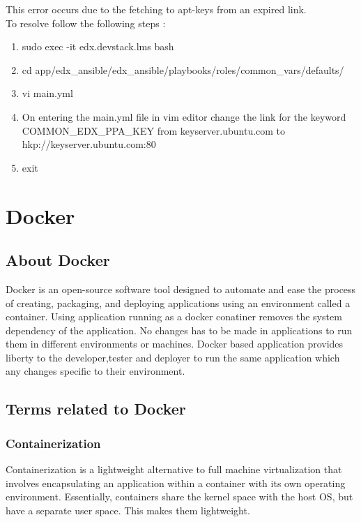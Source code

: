 \documentclass[12pt]{report}
\begin{document}
\begin{enumerate}
	This error occurs due to the fetching to apt-keys from an expired link.\\
	To resolve follow the following steps :
	\begin{enumerate}
		\item sudo exec -it edx.devstack.lms bash
		\item cd app/edx\_ansible/edx\_ansible/playbooks/roles/common\_vars/defaults/
		\item vi main.yml
		\item On entering the main.yml file in vim editor change the link for the keyword 
		COMMON\_EDX\_PPA\_KEY from keyserver.ubuntu.com to  hkp://keyserver.ubuntu.com:80
		\item exit
	\end{enumerate}
\end{enumerate}

\chapter{Docker}
\section{About Docker}
Docker is an open-source software tool designed to automate and ease the process of creating, packaging, and deploying applications using an environment called a container. Using application running as a docker conatiner removes the system dependency of the application. No changes has to be made in applications to run them in different environments or machines. Docker based application provides liberty to the developer,tester and deployer to run the same application which any changes specific to their environment. \cite{Docker}
\section{Terms related to Docker}
\subsection{Containerization}
Containerization is a lightweight alternative to full machine virtualization that involves encapsulating an application within a container with its own operating environment. Essentially, containers share the kernel space with the host OS, but have a separate user space. This makes them lightweight.
\end{document}

